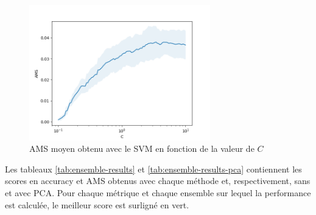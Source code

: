 \documentclass[12pt]{article}
\begin{document}
\begin{figure}[H]
    \center
    \includegraphics[width=0.7\textwidth]{images/ams.png}
    \caption{AMS moyen obtenu avec le SVM en fonction de la valeur de $C$}
    \label{img:ams-C}
\end{figure}

Les tableaux \ref{tab:ensemble-results} et \ref{tab:ensemble-results-pca}
contiennent les scores en accuracy et AMS obtenus avec chaque méthode et,
respectivement, sans et avec PCA. Pour chaque métrique et chaque ensemble sur
lequel la performance est calculée, le meilleur score est surligné en vert.

\begin{table}[H]
    \caption{Performances obtenues avec chaque méthode (sans PCA)}
    \label{tab:ensemble-results}
\end{table}
\end{document}
